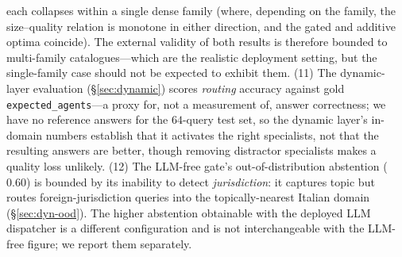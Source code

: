 \documentclass[11pt]{article}
\begin{document}
each collapses within a single dense family (where, depending on the family, the
size--quality relation is monotone in either direction, and the gated and additive
optima coincide). The external validity of both results is therefore bounded to
multi-family catalogues---which are the realistic deployment setting, but the
single-family case should not be expected to exhibit them. (11) The dynamic-layer
evaluation (§\ref{sec:dynamic}) scores \emph{routing} accuracy against gold
\texttt{expected\_agents}---a proxy for, not a measurement of, answer correctness;
we have no reference answers for the $64$-query test set, so the dynamic layer's
in-domain numbers establish that it activates the right specialists, not that the
resulting answers are better, though removing distractor specialists makes a quality
loss unlikely. (12) The LLM-free gate's out-of-distribution abstention ($0.60$) is
bounded by its inability to detect \emph{jurisdiction}: it captures topic but routes
foreign-jurisdiction queries into the topically-nearest Italian domain
(§\ref{sec:dyn-ood}). The higher abstention obtainable with the deployed LLM
dispatcher is a different configuration and is not interchangeable with the
LLM-free figure; we report them separately.
\end{document}
